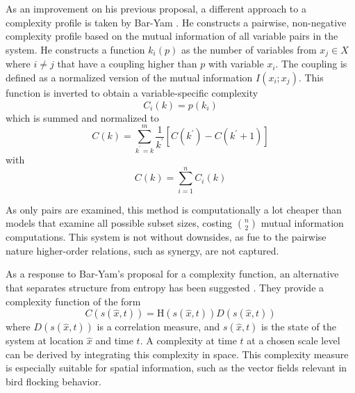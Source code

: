 \documentclass[../main.tex]{subfiles}
\begin{document}
As an improvement on his previous proposal, a different approach to a complexity profile is taken by Bar-Yam \cite{bar2013computationally}.
He constructs a pairwise, non-negative complexity profile based on the mutual information of all variable pairs in the system.
He constructs a function $k_i (p)$ as the number of variables from $x_j \in X$ where $i \ne j$ that have a coupling higher than $p$ with variable $x_i$.
The coupling is defined as a normalized version of the mutual information $I(x_i;x_j)$.
This function is inverted to obtain a variable-specific complexity
%
\begin{equation}
\overset{~}{C}_i(k) = p(k_i)
\end{equation}
%
which is summed and normalized to
%
\begin{equation}
C(k) = \sum_{k^\prime= k}^m \frac{1}{k^\prime} [\overset{~}{C} (k^\prime) - \overset{~}{C} (k^\prime + 1)]
\end{equation}
%
with
%
\begin{equation}
\overset{~}{C} (k) = \sum_{i=1}^n \overset{~}{C}_i (k)
\end{equation}

As only pairs are examined, this method is computationally a lot cheaper than models that examine all possible subset sizes, costing $\binom{n}{2}$ mutual information computations.
This system is not without downsides, as fue to the pairwise nature higher-order relations, such as synergy, are not captured.

As a response to Bar-Yam's proposal for a complexity function, an alternative that separates structure from entropy has been suggested \cite{arbona2014statistical}.
They provide a complexity function of the form
%
\begin{equation}
C(s(\hat{x},t)) = \mathrm{H}(s(\hat{x},t)) D(s(\hat{x},t))
\end{equation}
%
where $D(s(\hat{x},t))$ is a correlation measure, and $s(\hat{x},t)$ is the state of the system at location $\hat{x}$ and time $t$.
A complexity at time $t$ at a chosen scale level can be derived by integrating this complexity in space.
This complexity measure is especially suitable for spatial information, such as the vector fields relevant in bird flocking behavior.
\end{document}
